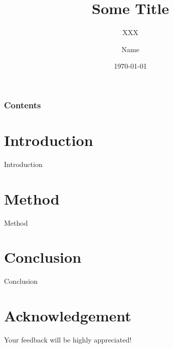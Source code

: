 \documentclass[10pt]{beamer}
\title[City University of Macau]{Some Title
}
\subtitle{XXX}
\author[Name]{Name}
\institute[E-mail@city.edu.mo]{ City University of Macau}
\date{\today}
\begin{document}
\frame{\titlepage}
\begin{frame}
\frametitle{Contents}
\tableofcontents
\end{frame}
\section{Introduction}
    \begin{frame}{Introduction}
    \end{frame}

\section{Method}
    \begin{frame}{Method}
    \end{frame}




\section{Conclusion}
    \begin{frame}{Conclusion}
    \end{frame}



\section*{Acknowledgement}  
\begin{frame}
\textcolor{myNewColorA}{\large{\centerline{ Your feedback will be highly appreciated!}}}
\end{frame}
\end{document}

